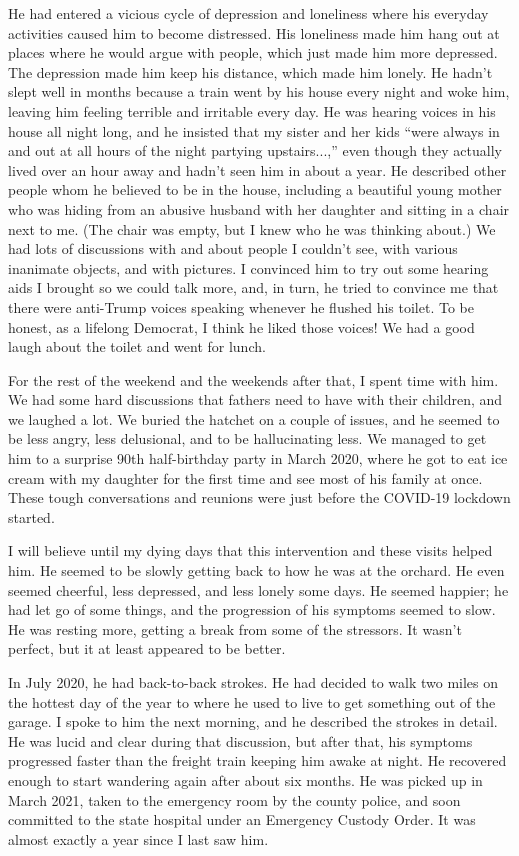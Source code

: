 \documentclass{article}
\begin{document}
He had entered a vicious cycle of depression and loneliness where his everyday activities caused him to become distressed. His loneliness made him hang out at places where he would argue with people, which just made him more depressed. The depression made him keep his distance, which made him lonely. He hadn't slept well in months because a train went by his house every night and woke him, leaving him feeling terrible and irritable every day. He was hearing voices in his house all night long, and he insisted that my sister and her kids ``were always in and out at all hours of the night partying upstairs...,'' even though they actually lived over an hour away and hadn't seen him in about a year. He described other people whom he believed to be in the house, including a beautiful young mother who was hiding from an abusive husband with her daughter and sitting in a chair next to me. (The chair was empty, but I knew who he was thinking about.)  We had lots of discussions with and about people I couldn't see, with various inanimate objects, and with pictures. I convinced him to try out some hearing aids I brought so we could talk more, and, in turn, he tried to convince me that there were anti-Trump voices speaking whenever he flushed his toilet. To be honest, as a lifelong Democrat, I think he liked those voices! We had a good laugh about the toilet and went for lunch.

For the rest of the weekend and the weekends after that, I spent time with him. We had some hard discussions that fathers need to have with their children, and we laughed a lot. We buried the hatchet on a couple of issues, and he seemed to be less angry, less delusional, and to be hallucinating less. We managed to get him to a surprise 90th half-birthday party in March 2020, where he got to eat ice cream with my daughter for the first time and see most of his family at once. These tough conversations and reunions were just before the COVID-19 lockdown started.

I will believe until my dying days that this intervention and these visits helped him. He seemed to be slowly getting back to how he was at the orchard. He even seemed cheerful, less depressed, and less lonely some days. He seemed happier; he had let go of some things, and the progression of his symptoms seemed to slow. He was resting more, getting a break from some of the stressors. It wasn't perfect, but it at least appeared to be better.

In July 2020, he had back-to-back strokes. He had decided to walk two miles on the hottest day of the year to where he used to live to get something out of the garage. I spoke to him the next morning, and he described the strokes in detail. He was lucid and clear during that discussion, but after that, his symptoms progressed faster than the freight train keeping him awake at night. He recovered enough to start wandering again after about six months. He was picked up in March 2021, taken to the emergency room by the county police, and soon committed to the state hospital under an Emergency Custody Order. It was almost exactly a year since I last saw him. 
\end{document}
